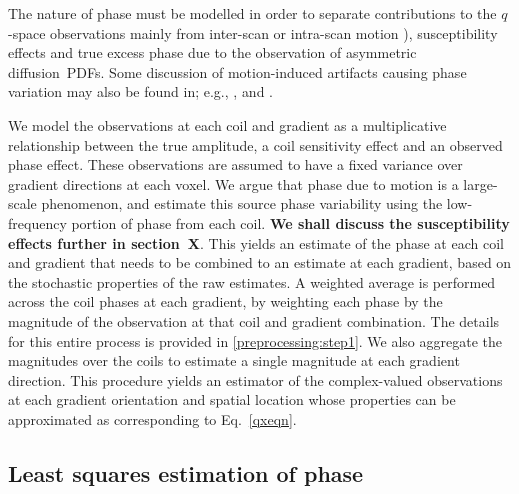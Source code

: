 \documentclass[authoryear,preprint,12pt]{elsarticle}
\begin{document}
The nature of phase must be modelled in order to separate
contributions to the $q$-space observations mainly from inter-scan or
intra-scan motion \citep{Aksoyetal2008}), susceptibility effects and
true excess phase due to the observation of asymmetric diffusion~PDFs.
Some discussion of motion-induced artifacts causing phase variation
may also be found in; e.g., \citet{Liu2005b}, \citet{Bretthorst} and
\citet{Aksoyetal2008}.

We model the observations at each coil and gradient as a
multiplicative relationship between the true amplitude, a coil
sensitivity effect and an observed phase effect.  These observations
are assumed to have a fixed variance over gradient directions at each
voxel.  We argue that phase due to motion is a large-scale phenomenon,
and estimate this source phase variability using the low-frequency
portion of phase from each coil.  \textbf{We shall discuss the
  susceptibility effects further in section~X}.  This yields an
estimate of the phase at each coil and gradient that needs to be
combined to an estimate at each gradient, based on the stochastic
properties of the raw estimates.  A weighted average is performed
across the coil phases at each gradient, by weighting each phase by
the magnitude of the observation at that coil and gradient
combination.  The details for this entire process is provided in
\ref{preprocessing:step1}.  We also aggregate the magnitudes over the
coils to estimate a single magnitude at each gradient direction.  This
procedure yields an estimator of the complex-valued observations at
each gradient orientation and spatial location whose properties can be
approximated as corresponding to Eq.~\eqref{qxeqn}.
  
\subsection{Least squares estimation of phase}
\label{estimation}
\end{document}
